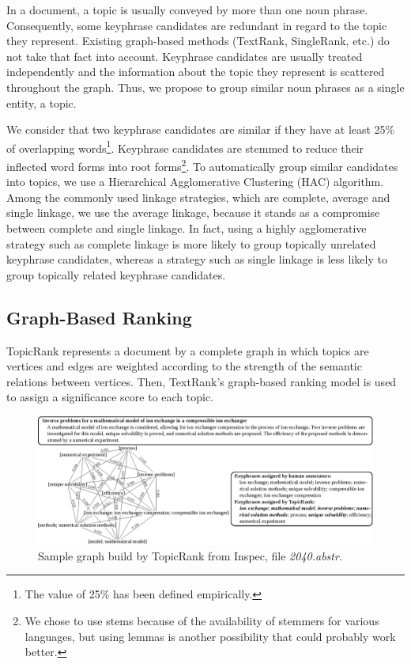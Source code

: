     In a document, a topic is usually conveyed by more than one noun phrase.
    Consequently, some keyphrase candidates are redundant in regard to the topic
    they represent. Existing graph-based methods (TextRank, SingleRank, etc.) do
    not take that fact into account. Keyphrase candidates are usually treated
    independently and the information about the topic they represent is
    scattered throughout the graph. Thus, we propose to group similar noun
    phrases as a single entity, a topic.

    We consider that two keyphrase candidates are similar if they have at least
    25\% of overlapping words\footnote{The value of 25\% has been defined
    empirically.}. Keyphrase candidates are stemmed to reduce their inflected
    word forms into root forms\footnote{We chose to use stems because of the
    availability of stemmers for various languages, but using lemmas is another
    possibility that could probably work better.}. To automatically group
    similar candidates into topics, we use a Hierarchical Agglomerative
    Clustering (HAC) algorithm. Among the commonly used linkage strategies,
    which are complete, average and single linkage, we use the average linkage,
    because it stands as a compromise between complete and single linkage. In
    fact, using a highly agglomerative strategy such as complete linkage is more
    likely to group topically unrelated keyphrase candidates, whereas a strategy
    such as single linkage is less likely to group topically related keyphrase
    candidates.

  \subsection{Graph-Based Ranking}
  \label{subsec:graph_based_ranking}
    TopicRank represents a document by a complete graph in which topics are
    vertices and edges are weighted according to the strength of the semantic
    relations between vertices. Then, TextRank's graph-based ranking model is
    used to assign a significance score to each topic.

    \begin{figure}
      \centering
      \includegraphics[width=\textwidth]{include/2040_full.eps}
      \caption{Sample graph build by TopicRank from Inspec, file
               \textit{2040.abstr}. \label{fig:topicrank}}
    \end{figure}

